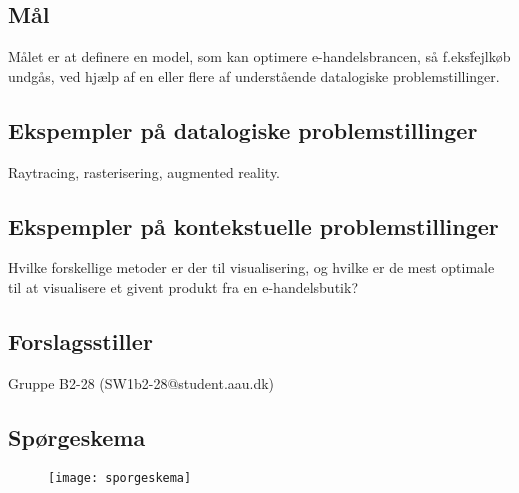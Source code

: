 \subsection*{Mål}
Målet er at definere en model, som kan optimere e-handelsbrancen, så f.eks\. fejlkøb undgås, ved hjælp af en eller flere af understående datalogiske problemstillinger.

\subsection*{Ekspempler på datalogiske problemstillinger}
Raytracing, rasterisering, augmented reality.

\subsection*{Ekspempler på kontekstuelle problemstillinger}
Hvilke forskellige metoder er der til visualisering, og hvilke er de mest optimale til at visualisere et givent produkt fra en e-handelsbutik?

\subsection*{Forslagsstiller}
Gruppe B2-28 (SW1b2-28@student.aau.dk)

\subsection{Spørgeskema}
\label{sec:skema}
\begin{figure}[H]
    \texttt{[image: sporgeskema]}
\end{figure}

